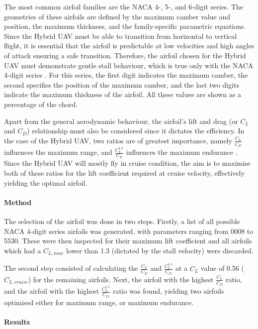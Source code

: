 The most common airfoil families are the NACA 4-, 5-, and 6-digit series. The geometries of these airfoils are defined by the maximum camber value and position, the maximum thickness, and the family-specific parametric equations. Since the Hybrid UAV must be able to transition from horizontal to vertical flight, it is essential that the airfoil is predictable at low velocities and high angles of attack ensuring a safe transition. Therefore, the airfoil chosen for the Hybrid UAV must demonstrate gentle stall behaviour, which is true only with the NACA 4-digit series \cite{naca_series}. For this series, the first digit indicates the maximum camber, the second specifies the position of the maximum camber, and the last two digits indicate the maximum thickness of the airfoil. All these values are shown as a percentage of the chord.

Apart from the general aerodynamic behaviour, the airfoil's lift and drag (or $C_{L}$ and $C_{D}$) relationship must also be considered since it dictates the efficiency. In the case of the Hybrid UAV, two ratios are of greatest importance, namely $\frac{C_{L}}{C_{D}}$ influences the maximum range, and $\frac{C_{L}^{1.5}}{C_{D}}$ influences the maximum endurance \cite{perf}. Since the Hybrid UAV will mostly fly in cruise condition, the aim is to maximise both of these ratios for the lift coefficient required at cruise velocity, effectively yielding the optimal airfoil.

\paragraph{Method} The selection of the airfoil was done in two steps. Firstly, a list of all possible NACA 4-digit series airfoils was generated, with parameters ranging from 0008 to 5530. These were then inspected for their maximum lift coefficient and all airfoils which had a $C_{L,max}$ lower than 1.3 (dictated by the stall velocity) were discarded. 

The second step consisted of calculating the $\frac{C_{L}}{C_{D}}$ and $\frac{C_{L}^{1.5}}{C_{D}}$ at a $C_{L}$ value of 0.56 ($C_{L,cruise}$) for the remaining airfoils. Next, the airfoil with the highest $\frac{C_{L}}{C_{D}}$ ratio, and the airfoil with the highest $\frac{C_{L}^{1.5}}{C_{D}}$ ratio was found, yielding two airfoils optimised either for maximum range, or maximum endurance.

\paragraph{Results} 

